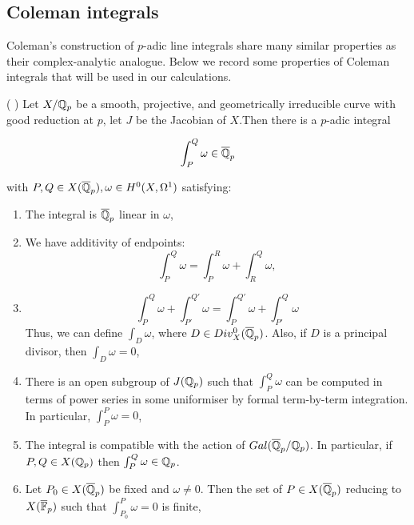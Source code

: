 \subsection{Coleman integrals}\label{sec:coleman_integration}

Coleman's construction of $p$-adic line integrals share many similar properties as their complex-analytic analogue. Below we record some properties of Coleman integrals  that will be used in our calculations.

\begin{theorem}{( \cite{Coleman1,coleman85} )} \label{coleman_def}
Let $X/\mathbb{Q}_p$ be a smooth, projective, and geometrically irreducible curve with good reduction at $p$, let $J$ be the Jacobian of $X$.Then there is a $p$-adic integral 

\[ \int_P^Q \omega \in \overline{\mathbb{Q}}_p\]

with $P,Q \in X(\overline{\mathbb{Q}}_p), \omega \in H^0(X,\Omega^1)$ satisfying:

\begin{enumerate}
    \item The integral is $\overline{\mathbb{Q}}_p$ linear in $\omega$,
    \item We have additivity of endpoints:
    \begin{equation*}
        \int_P^Q \omega = \int_P^R \omega + \int_R^Q \omega,
    \end{equation*}
    \item 
    \begin{equation*}
        \int_P^Q \omega + \int_{P'}^{Q'} \omega = \int_P^{Q'} \omega + \int_{P'}^Q \omega
    \end{equation*}
        Thus, we can define $\int_D \omega$, where $D \in Div^0_X(\overline{\mathbb{Q}}_p)$. Also, if $D$ is a principal divisor, then $\int_D \omega = 0$,
        
    \item There is an open subgroup of $J(\mathbb{Q}_p)$ such that $\int_P^Q \omega$ can be computed in terms of power series in some uniformiser by formal term-by-term integration. In particular, $\int_P^P \omega = 0$,



        \item The integral is compatible with the action of $Gal(\overline{\mathbb{Q}}_p/\mathbb{Q}_p)$. In particular, if $P,Q \in X(\mathbb{Q}_p)$ then $\int_P^Q \omega \in \mathbb{Q}_p$.
        \item Let $P_0 \in X(\overline{\mathbb{Q}}_p)$ be fixed and $\omega \neq 0$. Then the set of $P \in X(\overline{\mathbb{Q}}_p)$ reducing to $X(\overline{\mathbb{F}}_p)$ such that $\int_{P_0}^P \omega = 0$ is finite,


\end{enumerate}
\end{theorem}
